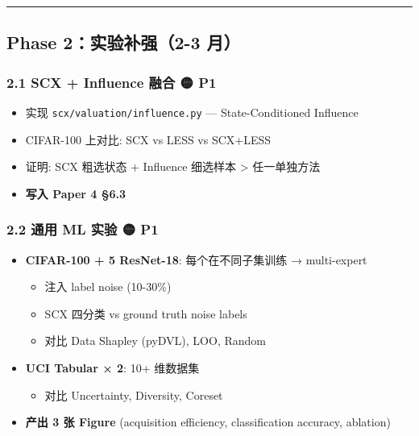 \documentclass[
  12pt,
]{ctexart}
\providecommand{\tightlist}{%
  \setlength{\itemsep}{0pt}\setlength{\parskip}{0pt}}
\begin{document}
\begin{center}\rule{0.5\linewidth}{0.5pt}\end{center}

\subsection{Phase 2：实验补强（2-3
月）}\label{phase-2ux5b9eux9a8cux8865ux5f3a2-3-ux6708}

\subsubsection{2.1 SCX + Influence 融合 🟡
P1}\label{scx-influence-ux878dux5408-p1}

\begin{itemize}
\tightlist
\item[$\square$]
  实现 \texttt{scx/valuation/influence.py} --- State-Conditioned
  Influence
\item[$\square$]
  CIFAR-100 上对比: SCX vs LESS vs SCX+LESS
\item[$\square$]
  证明: SCX 粗选状态 + Influence 细选样本 \textgreater{} 任一单独方法
\item[$\square$]
  \textbf{写入 Paper 4 §6.3}
\end{itemize}

\subsubsection{2.2 通用 ML 实验 🟡
P1}\label{ux901aux7528-ml-ux5b9eux9a8c-p1}

\begin{itemize}
\tightlist
\item[$\square$]
  \textbf{CIFAR-100 + 5 ResNet-18}: 每个在不同子集训练 → multi-expert

  \begin{itemize}
  \tightlist
  \item[$\square$]
    注入 label noise (10-30\%)
  \item[$\square$]
    SCX 四分类 vs ground truth noise labels
  \item[$\square$]
    对比 Data Shapley (pyDVL), LOO, Random
  \end{itemize}
\item[$\square$]
  \textbf{UCI Tabular × 2}: 10+ 维数据集

  \begin{itemize}
  \tightlist
  \item[$\square$]
    对比 Uncertainty, Diversity, Coreset
  \end{itemize}
\item[$\square$]
  \textbf{产出 3 张 Figure} (acquisition efficiency, classification
  accuracy, ablation)
\end{itemize}
\end{document}
